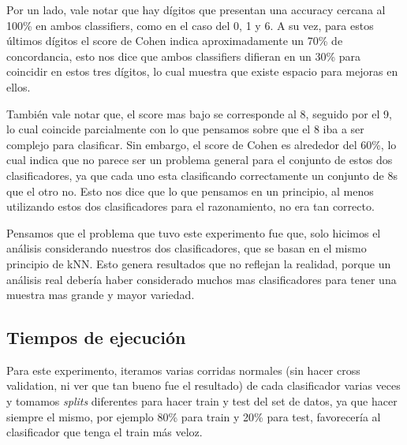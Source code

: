 \documentclass[a4paper]{article}
\begin{document}
    Por un lado, vale notar que hay dígitos que presentan una accuracy cercana al 100\% en ambos classifiers, como en el caso del 0, 1 y 6. A su vez, para estos últimos dígitos el score de Cohen indica aproximadamente un 70\% de concordancia, esto nos dice que ambos classifiers difieran en un 30\% para coincidir en estos tres dígitos, lo cual muestra que existe espacio para mejoras en ellos. 
    
    También vale notar que, el score mas bajo se corresponde al 8, seguido por el 9, lo cual coincide parcialmente con lo que pensamos sobre que el 8 iba a ser complejo para clasificar. Sin embargo, el score de Cohen es alrededor del 60\%, lo cual indica que no parece ser un problema general para el conjunto de estos dos clasificadores, ya que cada uno esta clasificando correctamente un conjunto de 8s que el otro no. Esto nos dice que lo que pensamos en un principio, al menos utilizando estos dos clasificadores para el razonamiento,  no era tan correcto. 
    
    Pensamos que el problema que tuvo este experimento fue que, solo hicimos el análisis considerando nuestros dos clasificadores, que se basan en el mismo principio de kNN. Esto genera resultados que no reflejan la realidad, porque un análisis real debería haber considerado muchos mas clasificadores para tener una muestra mas grande y mayor variedad.

    \subsection{Tiempos de ejecución}
    Para este experimento, iteramos varias corridas normales (sin hacer cross validation, ni ver que tan bueno fue el resultado) de cada clasificador varias veces y tomamos \textit{splits} diferentes para hacer train y test del set de datos, ya que hacer siempre el mismo, por ejemplo 80\% para train y 20\% para test, favorecería al clasificador que tenga el train más veloz.
    
\end{document}
